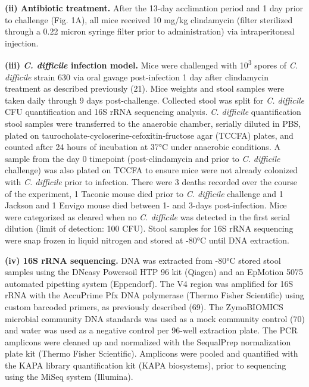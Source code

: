 \documentclass[
  11pt,
]{article}
\begin{document}
\textbf{(ii) Antibiotic treatment.} After the 13-day acclimation period
and 1 day prior to challenge (Fig. 1A), all mice received 10 mg/kg
clindamycin (filter sterilized through a 0.22 micron syringe filter
prior to administration) via intraperitoneal injection.

\textbf{(iii) \emph{C. difficile} infection model.} Mice were challenged
with 10\textsuperscript{3} spores of \emph{C. difficile} strain 630 via
oral gavage post-infection 1 day after clindamycin treatment as
described previously (21). Mice weights and stool samples were taken
daily through 9 days post-challenge. Collected stool was split for
\emph{C. difficile} CFU quantification and 16S rRNA sequencing analysis.
\emph{C. difficile} quantification stool samples were transferred to the
anaerobic chamber, serially diluted in PBS, plated on
taurocholate-cycloserine-cefoxitin-fructose agar (TCCFA) plates, and
counted after 24 hours of incubation at 37°C under anaerobic conditions.
A sample from the day 0 timepoint (post-clindamycin and prior to
\emph{C. difficile} challenge) was also plated on TCCFA to ensure mice
were not already colonized with \emph{C. difficile} prior to infection.
There were 3 deaths recorded over the course of the experiment, 1
Taconic mouse died prior to \emph{C. difficile} challenge and 1 Jackson
and 1 Envigo mouse died between 1- and 3-days post-infection. Mice were
categorized as cleared when no \emph{C. difficile} was detected in the
first serial dilution (limit of detection: 100 CFU). Stool samples for
16S rRNA sequencing were snap frozen in liquid nitrogen and stored at
-80°C until DNA extraction.

\textbf{(iv) 16S rRNA sequencing.} DNA was extracted from -80°C stored
stool samples using the DNeasy Powersoil HTP 96 kit (Qiagen) and an
EpMotion 5075 automated pipetting system (Eppendorf). The V4 region was
amplified for 16S rRNA with the AccuPrime Pfx DNA polymerase (Thermo
Fisher Scientific) using custom barcoded primers, as previously
described (69). The ZymoBIOMICS microbial community DNA standards was
used as a mock community control (70) and water was used as a negative
control per 96-well extraction plate. The PCR amplicons were cleaned up
and normalized with the SequalPrep normalization plate kit (Thermo
Fisher Scientific). Amplicons were pooled and quantified with the KAPA
library quantification kit (KAPA biosystems), prior to sequencing using
the MiSeq system (Illumina).
\end{document}
